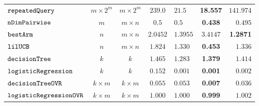 {\begin {table}[t]
\begin{center}
{\begin{tabular}{|| >{\tiny}l || c | c || c || l | c | r ||  }
         \hhline{||-||--||-||---||}
         $\mathtt{repeatedQuery}$~\cite{Jamieson2015TheAO} & $ m \times 2^m $ & $  m \times 2^m $ & $239.0$   & $21.5$ & {\textbf{18.557}} & $141.974$  \\
         \hhline{||-||--||-||---||}
         $\mathtt{nDimPairwise}$~\cite{Jamieson2015TheAO} & $ m $ & $  m \times n  $ & $0.5$   & $0.5$ & {\textbf{ 0.438}} & {$0.495$}  \\
         \hhline{||-||--||-||---||}
         $\mathtt{bestArm}$~\cite{Jamieson2015TheAO} & $ n $ & $  m \times n $ & $ 2.0452$   & $ 1.3955$ & {{$3.4147$}} & \textbf{1.2871}  \\
         \hhline{||-||--||-||---||}
         $\mathtt{lilUCB}$~\cite{Jamieson2015TheAO} & $ n $ & $ m \times n $ & $1.824$   & $ 1.330$ & {\textbf{0.453}} & $ 1.336$  \\
         \hhline{||-||--||-||---||}
         $\mathtt{decisionTree}$ & $k$ &  $k$ & $ 1.465$  & $ 1.283$ & \textbf{1.379 } & {$1.414$}  \\
         \hhline{||-||--||-||---||}
         $  \mathtt{logisticRegression}$ & $k$ &  $k$ & $ 0.152$  &  $ 0.001$ & {\textbf{0.001}} & {$0.002$}   \\
        \hhline{||-||--||-||---||}
        $  \mathtt{decisionTreeOVR}$ & $k \times m$ &  $ k \times m $ &  $0.055$ & $0.053$  &  {\textbf{0.007}} & $0.036$  \\
        \hhline{||-||--||-||---||}
        $  \mathtt{logisticRegressionOVR}$    & $k \times m$ &  $ k \times m $ &  $ 1.000  $  &  $ 1.000 $ & {\textbf{ 0.999}} & $ 1.002 $ \\

\end{tabular}}
\end{center}
\end{table}}
